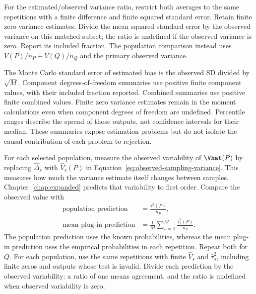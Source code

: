 For the estimated/observed variance ratio, restrict both averages to
the same repetitions with a finite difference and finite squared
standard error. Retain finite zero variance estimates. Divide the mean
squared standard error by the observed variance on this matched subset;
the ratio is undefined if the observed variance is zero. Report its
included fraction. The population comparison instead uses
\(V(P)/n_P+V(Q)/n_Q\) and the primary observed variance.

The Monte Carlo standard error of estimated bias is the observed SD
divided by \(\sqrt M\). Component degrees-of-freedom summaries use positive finite component
values, with their included fraction reported. Combined summaries use
positive finite combined values. Finite zero variance estimates remain
in the moment calculations even when component degrees of freedom are undefined. Percentile ranges describe the spread of those outputs,
not confidence intervals for their median. These summaries expose
estimation problems but do not isolate the causal contribution of
each problem to rejection.

\medskip
{}

For each selected population, measure the observed variability of
\(\Vhat(P)\) by replacing \(\widehat\Delta_s\) with
\(\widehat V_s(P)\) in Equation~\eqref{eq:observed-sampling-variance}.
This measures how much the variance estimate itself changes between
samples. Chapter~\ref{chap:expanded} predicts that variability to first
order. Compare the observed value with
\begin{equation}
\begin{aligned}
 \text{population prediction}&=\frac{\tau^2(P)}{n_P},\\
 \text{mean plug-in prediction}&=
 \frac{1}{M}\sum_{s=1}^{M}\frac{\widehat\tau_s^2(P)}{n_P}.
\end{aligned}
 \label{eq:variance-stability-predictions}
\end{equation}
The population prediction uses the known probabilities, whereas the mean plug-in
prediction uses the empirical probabilities in each repetition. Repeat both for
\(Q\). For each population, use the same repetitions with finite
\(\widehat V_s\) and \(\widehat\tau_s^2\), including finite zeros
and outputs whose test is invalid. Divide each prediction by the observed
variability: a ratio of one means agreement, and the ratio is undefined
when observed variability is zero.

\medskip
{}

